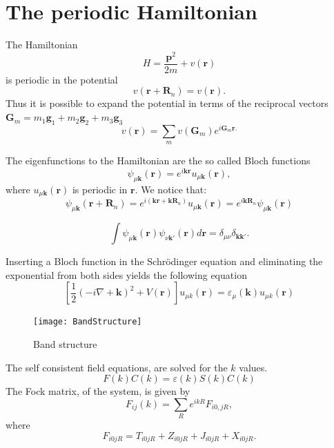 \documentclass[12pt,a4paper,english]{beamer}
\newcommand{\mbf}{ \mathbf }
\begin{document}
\section{The periodic Hamiltonian}
\begin{frame}
  The Hamiltonian 
  $$H=\frac{\mbf p^2}{2m}+v(\mbf r)$$
  is periodic in the potential
  $$v(\mbf r+\mbf R_n)=v(\mbf r).$$
  Thus it is possible to expand the potential in terms of the reciprocal
  vectors $\mbf G_m=m_1\mbf g_1+m_2\mbf g_2+m_3\mbf g_3$
  $$v(\mbf r)=\sum_mv(\mbf G_m)e^{i\mbf G_m\mbf r.}$$
\end{frame}

\begin{frame}
  The eigenfunctions to the Hamiltonian are the so called Bloch functions
  $$\psi_{\mu\mbf k}(\mbf r)=e^{i\mbf k\mbf r}u_{\mu\mbf k}(\mbf r),$$ where $u_{\mu\mbf k}(\mbf r)$ is periodic in $\mbf r$.
  We notice that:
  $$\psi_{\mu\mbf k}(\mbf r+\mbf R_n)=e^{i(\mbf k\mbf r+\mbf k\mbf R_n)}u_{\mu\mbf k}(\mbf r)=e^{i\mbf k\mbf R_n}\psi_{\mu\mbf k}(\mbf r)$$

  $$\int  \psi_{\mu \mbf k}(\mbf r)\psi_{\nu \mbf k'}(\mbf r)d\mbf r=\delta_{\mu\nu}\delta_{\mbf k \mbf k'}.$$

\end{frame}

\begin{frame}
  Inserting a Bloch function in the Schr\"odinger equation and eliminating the
  exponential from both sides yields the following equation
  \begin{equation*}
		  \left[\frac{1}{2}\left(-i\nabla+\mbf k\right)^2+V(\mbf r)\right]u_{\mu k}(\mbf r)=\varepsilon_{\mu}(\mbf k)u_{\mu k}(\mbf r)
  \end{equation*}
\end{frame}

\begin{frame}
    \begin{figure}[htp]
\centering
\texttt{[image: BandStructure]}
\caption{Band structure}
\label{fig:bands}
\end{figure}
\end{frame}


\begin{frame}
		The self consistent field equations, are solved for the $k$ values.
		\begin{equation*}
				F(k)C(k)=\varepsilon(k)S(k)C(k)
		\end{equation*}
  The Fock matrix, of the system, is given by
  \begin{equation}
	F_{ij}(k)=\sum_{R}e^{ikR}F_{i0,jR},
	   \label{hfbleq:totmatx2}
	 \end{equation}
	 where 
	 \begin{equation}
	   F_{i0jR}=T_{i0jR}+Z_{i0jR}+J_{i0jR}+X_{i0jR}.
	 \end{equation}
\end{frame}
\end{document}
